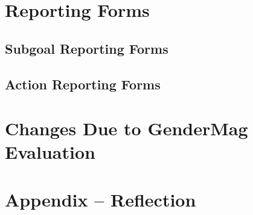 \documentclass[12pt, titlepage]{article}
\begin{document}
\section{Reporting Forms}
\subsection{Subgoal Reporting Forms}



\subsection{Action Reporting Forms}




\section{Changes Due to GenderMag Evaluation}


\newpage
\section*{Appendix -- Reflection}
\end{document}
